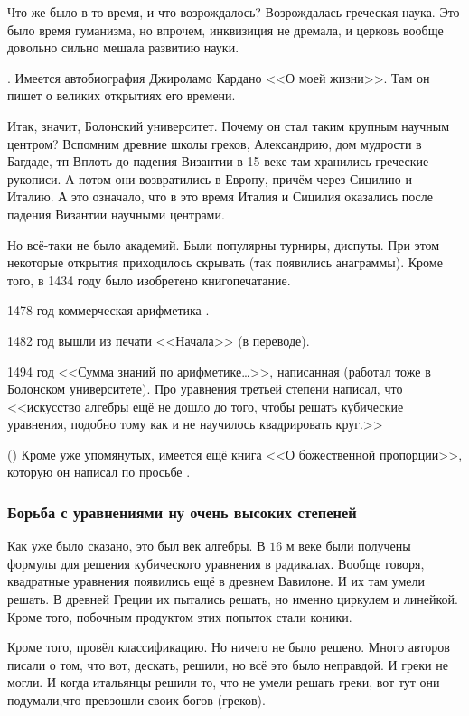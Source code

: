 \documentclass[a4paper,oneside,fleqn,10pt]{article}
\begin{document}
Что же было в то время, и что возрождалось? Возрождалась греческая наука.
Это было время гуманизма, но впрочем, инквизиция не дремала, и церковь вообще довольно сильно
мешала развитию науки.

. Имеется автобиография Джироламо Кардано <<О моей жизни>>. Там он пишет о великих открытиях
его времени.

Итак, значит, Болонский университет. Почему он стал таким крупным научным центром?
Вспомним древние школы греков, Александрию, дом мудрости в Багдаде, тп
Вплоть до падения Византии в 15 веке там хранились греческие рукописи. А потом они возвратились в Европу,
причём через Сицилию и Италию. А это означало, что в это время Италия и Сицилия оказались после падения Византии
научными центрами.

Но всё-таки не было академий. Были популярны турниры, диспуты. При этом некоторые открытия
приходилось скрывать (так появились анаграммы). Кроме того, в 1434 году было изобретено книгопечатание.

1478 год коммерческая арифметика .

1482 год вышли из печати <<Начала>> (в переводе).

1494 год <<Сумма знаний по арифметике\ldots>>, написанная  (работал тоже
в Болонском университете). Про уравнения третьей степени написал, что <<искусство алгебры
ещё не дошло до того, чтобы решать кубические уравнения, подобно тому
как и не научилось квадрировать круг.>>

 () Кроме уже упомянутых,
имеется ещё книга <<О божественной пропорции>>, которую он написал по просьбе
.

\subsubsection{Борьба с уравнениями ну очень высоких степеней}

Как уже было сказано, это был век алгебры. В $16$ м веке были получены формулы
для решения кубического уравнения в радикалах. Вообще говоря, квадратные уравнения появились
ещё в древнем Вавилоне. И их там умели решать. В древней Греции их пытались решать, но именно
циркулем и линейкой. Кроме того, побочным продуктом этих попыток стали коники.

Кроме того,  провёл классификацию. Но ничего не было решено. Много авторов писали
о том, что вот, дескать, решили, но всё это было неправдой. И греки не могли.
И когда итальянцы решили то, что не умели решать греки, вот тут они подумали,что превзошли своих богов (греков).
\end{document}
